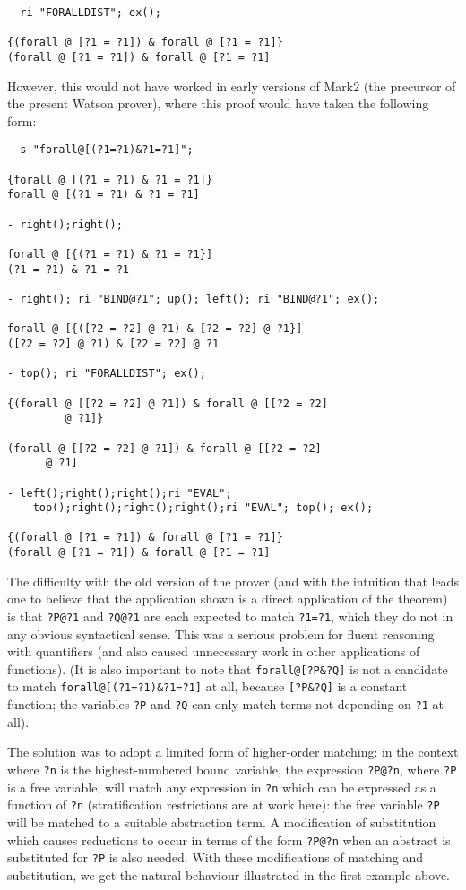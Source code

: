 \documentclass{kluwer}
\begin{document}
\begin{article}
\begin{verbatim}
- ri "FORALLDIST"; ex();

{(forall @ [?1 = ?1]) & forall @ [?1 = ?1]}
(forall @ [?1 = ?1]) & forall @ [?1 = ?1]
\end{verbatim}

However, this would not have worked in early versions of Mark2 (the
precursor of the present Watson prover), where this proof would have
taken the following form:

\newpage

\begin{verbatim}
- s "forall@[(?1=?1)&?1=?1]";

{forall @ [(?1 = ?1) & ?1 = ?1]}
forall @ [(?1 = ?1) & ?1 = ?1]

- right();right();

forall @ [{(?1 = ?1) & ?1 = ?1}]
(?1 = ?1) & ?1 = ?1

- right(); ri "BIND@?1"; up(); left(); ri "BIND@?1"; ex();

forall @ [{([?2 = ?2] @ ?1) & [?2 = ?2] @ ?1}]
([?2 = ?2] @ ?1) & [?2 = ?2] @ ?1

- top(); ri "FORALLDIST"; ex();

{(forall @ [[?2 = ?2] @ ?1]) & forall @ [[?2 = ?2] 
         @ ?1]}

(forall @ [[?2 = ?2] @ ?1]) & forall @ [[?2 = ?2] 
      @ ?1]

- left();right();right();ri "EVAL";
	top();right();right();right();ri "EVAL"; top(); ex();

{(forall @ [?1 = ?1]) & forall @ [?1 = ?1]}
(forall @ [?1 = ?1]) & forall @ [?1 = ?1]
\end{verbatim}

The difficulty with the old version of the prover (and with the
intuition that leads one to believe that the application shown is a
direct application of the theorem) is that {\tt ?P@?1} and {\tt ?Q@?1} are each
expected to match {\tt ?1=?1}, which they do not in any obvious syntactical
sense.  This was a serious problem for fluent reasoning with
quantifiers (and also caused unnecessary work in other applications of
functions).  (It is also important to note that {\tt forall@[?P\&?Q]}
is not a candidate to match {\tt forall@[(?1=?1)\&?1=?1]} at all,
because {\tt [?P\&?Q]} is a constant function; the variables {\tt ?P}
and {\tt ?Q} can only match terms not depending on {\tt ?1} at all).

The solution was to adopt a limited form of higher-order matching: in
the context where {\tt ?n} is the highest-numbered bound variable, the
expression {\tt ?P@?n}, where {\tt ?P} is a free variable, will match
any expression in {\tt ?n} which can be expressed as a function of
{\tt ?n} (stratification restrictions are at work here): the free
variable {\tt ?P} will be matched to a suitable abstraction term.  A
modification of substitution which causes reductions to occur in terms
of the form {\tt ?P@?n} when an abstract is substituted for {\tt ?P}
is also needed.  With these modifications of matching and
substitution, we get the natural behaviour illustrated in the first
example above.


\end{article}
\end{document}
